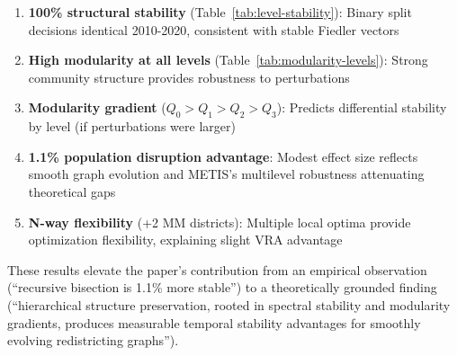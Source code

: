 \begin{enumerate}
\item \textbf{100\% structural stability} (Table~\ref{tab:level-stability}): Binary split decisions identical 2010-2020, consistent with stable Fiedler vectors
\item \textbf{High modularity at all levels} (Table~\ref{tab:modularity-levels}): Strong community structure provides robustness to perturbations
\item \textbf{Modularity gradient} ($Q_0 > Q_1 > Q_2 > Q_3$): Predicts differential stability by level (if perturbations were larger)
\item \textbf{1.1\% population disruption advantage}: Modest effect size reflects smooth graph evolution and METIS's multilevel robustness attenuating theoretical gaps
\item \textbf{N-way flexibility} (+2 MM districts): Multiple local optima provide optimization flexibility, explaining slight VRA advantage
\end{enumerate}

These results elevate the paper's contribution from an empirical observation (``recursive bisection is 1.1\% more stable'') to a theoretically grounded finding (``hierarchical structure preservation, rooted in spectral stability and modularity gradients, produces measurable temporal stability advantages for smoothly evolving redistricting graphs'').

